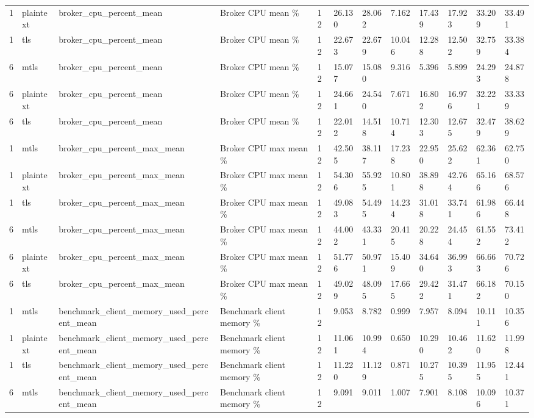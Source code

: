 \begin{longtable}{llllllllllll}
1 & plaintext & broker\_cpu\_percent\_mean & Broker CPU mean \% & 12 & 26.130 & 28.062 & 7.162 & 17.439 & 17.923 & 33.209 & 33.491 \\
1 & tls & broker\_cpu\_percent\_mean & Broker CPU mean \% & 12 & 22.673 & 22.679 & 10.046 & 12.288 & 12.502 & 32.759 & 33.384 \\
6 & mtls & broker\_cpu\_percent\_mean & Broker CPU mean \% & 12 & 15.077 & 15.080 & 9.316 & 5.396 & 5.899 & 24.293 & 24.878 \\
6 & plaintext & broker\_cpu\_percent\_mean & Broker CPU mean \% & 12 & 24.661 & 24.540 & 7.671 & 16.802 & 16.976 & 32.221 & 33.339 \\
6 & tls & broker\_cpu\_percent\_mean & Broker CPU mean \% & 12 & 22.012 & 14.518 & 10.714 & 12.303 & 12.675 & 32.479 & 38.629 \\
1 & mtls & broker\_cpu\_percent\_max\_mean & Broker CPU max mean \% & 12 & 42.505 & 38.117 & 17.238 & 22.950 & 25.622 & 62.361 & 62.750 \\
1 & plaintext & broker\_cpu\_percent\_max\_mean & Broker CPU max mean \% & 12 & 54.306 & 55.925 & 10.801 & 38.898 & 42.764 & 65.166 & 68.576 \\
1 & tls & broker\_cpu\_percent\_max\_mean & Broker CPU max mean \% & 12 & 49.083 & 54.495 & 14.234 & 31.018 & 33.741 & 61.986 & 66.448 \\
6 & mtls & broker\_cpu\_percent\_max\_mean & Broker CPU max mean \% & 12 & 44.002 & 43.331 & 20.415 & 20.228 & 24.454 & 61.552 & 73.412 \\
6 & plaintext & broker\_cpu\_percent\_max\_mean & Broker CPU max mean \% & 12 & 51.776 & 50.971 & 15.409 & 34.640 & 36.993 & 66.663 & 70.726 \\
6 & tls & broker\_cpu\_percent\_max\_mean & Broker CPU max mean \% & 12 & 49.029 & 48.095 & 17.665 & 29.422 & 31.471 & 66.182 & 70.150 \\
1 & mtls & benchmark\_client\_memory\_used\_percent\_mean & Benchmark client memory \% & 12 & 9.053 & 8.782 & 0.999 & 7.957 & 8.094 & 10.111 & 10.356 \\
1 & plaintext & benchmark\_client\_memory\_used\_percent\_mean & Benchmark client memory \% & 12 & 11.061 & 10.994 & 0.650 & 10.290 & 10.462 & 11.620 & 11.998 \\
1 & tls & benchmark\_client\_memory\_used\_percent\_mean & Benchmark client memory \% & 12 & 11.220 & 11.129 & 0.871 & 10.275 & 10.395 & 11.955 & 12.441 \\
6 & mtls & benchmark\_client\_memory\_used\_percent\_mean & Benchmark client memory \% & 12 & 9.091 & 9.011 & 1.007 & 7.901 & 8.108 & 10.096 & 10.371 \\

\end{longtable}
